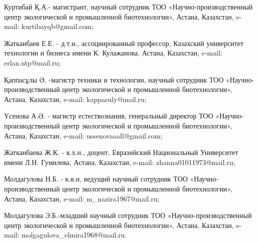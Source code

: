 \begin{noparindent}
Куртибай Қ.А.- магистрант, научный сотрудник ТОО
«Научно-производственный центр экологической и промышленной
биотехнологии», Астана, Казахстан, e-mail: kurtibayqb@gmail.com;

Жатканбаев Е.Е. - д.т.н., ассоциированный профессор, Казахский
университет технологии и бизнеса имени К. Кулажанова, Астана, Казахстан,
e-mail: erlan.ntp@mail.ru;

Қаппасұлы Ә. -магистр техники и технологии, научный сотрудник ТОО
«Научно-производственный центр экологической и промышленной
биотехнологии», Астана, Казахстан, e-mail: kappasuly@mail.ru;

Үсенова А.Ә. - магистр естествознания, генеральный директор ТОО
«Научно-производственный центр экологической и промышленной
биотехнологии», Астана, Казахстан, e-mail: ussenovaaall@gmail.com;

Жатканбаева Ж.К. - к.х.н., доцент, Евразийский Национальный Университет
имени Л.Н. Гумилева, Астана, Казахстан, e-mail: zhanna01011973@mail.ru;

Молдагулова Н.Б. - к.в.н, ведущий научный сотрудник ТОО
«Научно-производственный центр экологической и промышленной
биотехнологии», Астана, Казахстан, e-mail: m\_nazira1967@mail.ru;

Молдагулова Э.Б.-младший научный сотрудник ТОО «Научно-производственный
центр экологической и промышленной биотехнологии», Астана, Казахстан,
e-mail: molgagulova\_elmira1968@mail.ru.
\end{noparindent}

